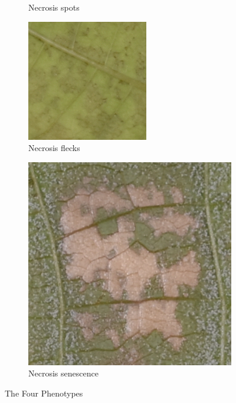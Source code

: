 \documentclass[english]{article}
\begin{document}
\begin{figure}[H]
\begin{subfigure}[b]{0.2\linewidth}
		\caption{Necrosis spots}\label{fig:necrosisspots}
	\end{subfigure}
	\begin{subfigure}[b]{0.2\linewidth}
		\includegraphics[width=\linewidth]{Exp20DM01_inoc2_T6_P47_c_4.png}
		\caption{Necrosis flecks}\label{fig:necrosisstains}
	\end{subfigure}
	\begin{subfigure}[b]{0.2\linewidth}
		\includegraphics[width=\linewidth]{Exp21DM04_inoc2_T6_P12_a_3.png}
		\caption{Necrosis senescence}\label{fig:necrosissenescence}
	\end{subfigure}
	\caption{The Four Phenotypes}\label{fig:phenotypes}
\end{figure}
\end{document}

